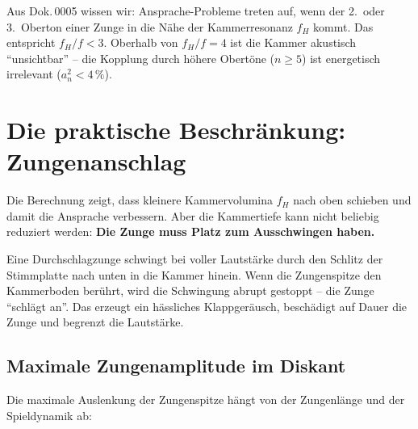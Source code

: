 \documentclass[11pt,a4paper]{article}
\begin{document}
Aus Dok.\,0005 wissen wir: Ansprache-Probleme treten auf, wenn der 2.~oder 3.~Oberton einer Zunge in die Nähe der Kammerresonanz $f_H$ kommt. Das entspricht $f_H/f < 3$. Oberhalb von $f_H/f = 4$ ist die Kammer akustisch ``unsichtbar'' -- die Kopplung durch höhere Obertöne ($n \geq 5$) ist energetisch irrelevant ($a_n^2 < 4\,\%$).


\section{Die praktische Beschränkung: Zungenanschlag}

Die Berechnung zeigt, dass kleinere Kammervolumina $f_H$ nach oben schieben und damit die Ansprache verbessern. Aber die Kammertiefe kann nicht beliebig reduziert werden: \textbf{Die Zunge muss Platz zum Ausschwingen haben.}

Eine Durchschlagzunge schwingt bei voller Lautstärke durch den Schlitz der Stimmplatte nach unten in die Kammer hinein. Wenn die Zungenspitze den Kammerboden berührt, wird die Schwingung abrupt gestoppt -- die Zunge ``schlägt an''. Das erzeugt ein hässliches Klappgeräusch, beschädigt auf Dauer die Zunge und begrenzt die Lautstärke.

\subsection{Maximale Zungenamplitude im Diskant}

Die maximale Auslenkung der Zungenspitze hängt von der Zungenlänge und der Spieldynamik ab:

\begin{table}[H]
\centering\small
{}
\caption{Geschätzte Zungenamplituden und Mindesttiefen (Amplitude $\approx$ 10\,\% der Zungenlänge $+$ 0{,}5\,mm Sicherheit)}
\end{table}
\end{document}
